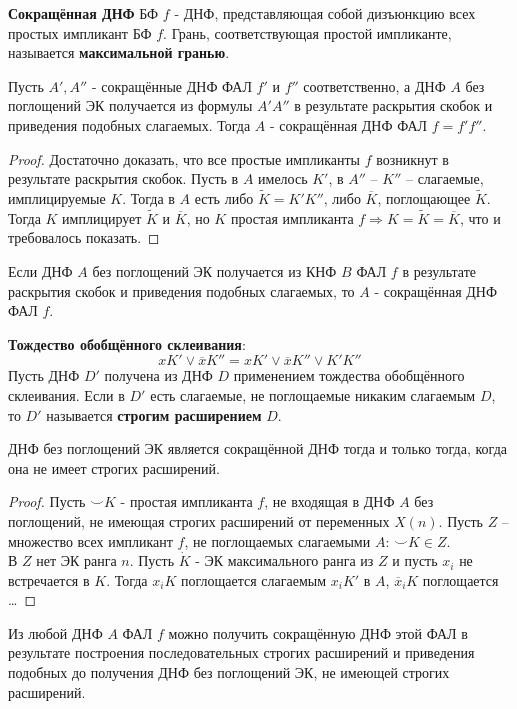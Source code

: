 \documentclass[11pt]{article}
\newcounter{th}\setcounter{th}{0}
\newcounter{cnsqnc}\setcounter{cnsqnc}{0}
\def\cnsqnc{\par\smallskip\refstepcounter{cnsqnc}\textbf{\arabic{cnsqnc}}}
\newtheorem*{Consequence}{Следствие \cnsqnc}
\newcounter{stnmt}\setcounter{stnmt}{0}
\def\st{\par\smallskip\refstepcounter{stnmt}\textbf{\arabic{stnmt}}}
\newtheorem*{Statement}{Утверждение \st}
\begin{document}
\textbf{Сокращённая ДНФ} БФ \(f\) - ДНФ, представляющая собой дизъюнкцию всех простых импликант БФ \(f\).
Грань, соответствующая простой импликанте, называется \textbf{максимальной гранью}.
\begin{Statement}
Пусть $A', A''$ - сокращённые ДНФ ФАЛ $f'$ и $f''$ соответственно, а ДНФ $A$ без поглощений
ЭК получается из формулы $A'A''$ в результате раскрытия скобок и приведения подобных слагаемых.
Тогда $A$ - сокращённая ДНФ ФАЛ $f = f'f''$.
\end{Statement}
\begin{proof}
Достаточно доказать, что все простые импликанты $f$ возникнут в результате раскрытия скобок.
Пусть в $A$ имелось $K'$, в $A''$ -- $K''$ -- слагаемые, имплицируемые $K$. Тогда в $A$ есть
либо $\tilde{K} = K'K''$, либо $\overline{K}$, поглощающее $\tilde{K}$. Тогда $K$ имплицирует
$\tilde{K}$ и $\overline{K}$, но $K$ простая импликанта $f \Rightarrow K = \tilde{K} = \overline{K}$,
что и требовалось показать.
\end{proof}
\begin{Consequence}
Если ДНФ $A$ без поглощений ЭК получается из КНФ $B$ ФАЛ $f$ в результате раскрытия скобок и
приведения подобных слагаемых, то $A$ - сокращённая ДНФ ФАЛ $f$.
\end{Consequence}
\textbf{Тождество обобщённого склеивания}:\\
\begin{equation*}
xK'\vee\overline{x}K'' = xK'\vee\overline{x}K''\vee K'K''
\end{equation*}
Пусть ДНФ \(D'\) получена из ДНФ \(D\) применением тождества обобщённого склеивания. Если в \(D'\)
есть слагаемые, не поглощаемые никаким слагаемым \(D\), то \(D'\) называется \textbf{строгим расширением}
\(D\).
\begin{Statement}
ДНФ без поглощений ЭК является сокращённой ДНФ тогда и только тогда, когда она не имеет
строгих расширений.
\end{Statement}
\begin{proof}
Пусть $\smallsmile{K}$ - простая импликанта $f$, не входящая в ДНФ $A$ без поглощений, не
имеющая строгих расширений от переменных $X(n)$. Пусть $Z$ -- множество всех импликант $f$,
не поглощаемых слагаемыми $A$: $\smallsmile{K} \in Z$.\\
В $Z$ нет ЭК ранга $n$. Пусть $\dot{K}$ - ЭК максимального ранга из $Z$ и пусть $x_i$ не
встречается в $K$. Тогда $x_iK$ поглощается слагаемым $x_iK'$ в $A$, $\overline{x}_iK$
поглощается \ldots
\end{proof}
\begin{Consequence}
Из любой ДНФ $A$ ФАЛ $f$ можно получить сокращённую ДНФ этой ФАЛ в результате построения
последовательных строгих расширений и приведения подобных до получения ДНФ без поглощений ЭК,
не имеющей строгих расширений.
\end{Consequence}
\end{document}
